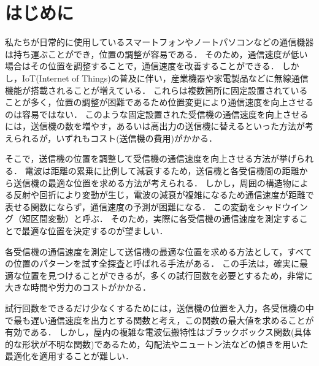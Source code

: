 \documentclass[twocolumn]{ltjarticle}
\begin{document}



\section{はじめに}
私たちが日常的に使用しているスマートフォンやノートパソコンなどの通信機器は持ち運ぶことができ，位置の調整が容易である．
そのため，通信速度が低い場合はその位置を調整することで，通信速度を改善することができる．
しかし，IoT(Internet of Things)の普及に伴い，産業機器や家電製品などに無線通信機能が搭載されることが増えている\cite{soumu}．
これらは複数箇所に固定設置されていることが多く，位置の調整が困難であるため位置変更により通信速度を向上させるのは容易ではない．
このような固定設置された受信機の通信速度を向上させるには，送信機の数を増やす，あるいは高出力の送信機に替えるといった方法が考えられるが，いずれもコスト(送信機の費用)がかかる．

そこで，送信機の位置を調整して受信機の通信速度を向上させる方法が挙げられる．
電波は距離の累乗に比例して減衰するため，送信機と各受信機間の距離から送信機の最適な位置を求める方法が考えられる．
しかし，周囲の構造物による反射や回折により変動が生じ，電波の減衰が複雑になるため通信速度が距離で表せる関数にならず，通信速度の予測が困難になる．
この変動をシャドウイング（短区間変動）と呼ぶ．
そのため，実際に各受信機の通信速度を測定することで最適な位置を決定するのが望ましい．

各受信機の通信速度を測定して送信機の最適な位置を求める方法として，すべての位置のパターンを試す全探査と呼ばれる手法がある．
この手法は，確実に最適な位置を見つけることができるが，多くの試行回数を必要とするため，非常に大きな時間や労力のコストがかかる．

試行回数をできるだけ少なくするためには，送信機の位置を入力，各受信機の中で最も遅い通信速度を出力とする関数と考え，この関数の最大値を求めることが有効である．
しかし，屋内の複雑な電波伝搬特性はブラックボックス関数(具体的な形状が不明な関数)であるため，勾配法やニュートン法などの傾きを用いた最適化を適用することが難しい．
\end{document}
